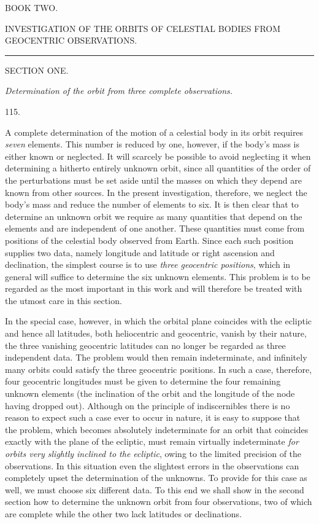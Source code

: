 \clearpage
{}
\begin{center}
{\Large BOOK TWO.}\par\bigskip
{\large INVESTIGATION OF THE ORBITS OF CELESTIAL BODIES FROM GEOCENTRIC OBSERVATIONS.}\par\bigskip
\rule{3em}{.3pt}\par\bigskip
{}
{\large SECTION ONE.}\par\medskip
\emph{Determination of the orbit from three complete observations.}\par\bigskip
\hypertarget{native-161-article115}{}115.
\end{center}
A complete determination of the motion of a celestial body in its orbit requires \emph{seven} elements. This number is reduced by one, however, if the body's mass is either known or neglected. It will scarcely be possible to avoid neglecting it when determining a hitherto entirely unknown orbit, since all quantities of the order of the perturbations must be set aside until the masses on which they depend are known from other sources. In the present investigation, therefore, we neglect the body's mass and reduce the number of elements to six. It is then clear that to determine an unknown orbit we require as many quantities that depend on the elements and are independent of one another. These quantities must come from positions of the celestial body observed from Earth. Since each such position supplies two data, namely longitude and latitude or right ascension and declination, the simplest course is to use \emph{three geocentric positions}, which in general will suffice to determine the six unknown elements. This problem is to be regarded as the most important in this work and will therefore be treated with the utmost care in this section.

In the special case, however, in which the orbital plane coincides with the ecliptic and hence all latitudes, both heliocentric and geocentric, vanish by their nature, the three vanishing geocentric latitudes can no longer be regarded as three independent data. The problem would then remain indeterminate, and infinitely many orbits could satisfy the three geocentric positions. In such a case, therefore, four geocentric longitudes must be given to determine the four remaining unknown elements (the inclination of the orbit and the longitude of the node having dropped out). Although on the principle of indiscernibles there is no reason to expect such a case ever to occur in nature, it is easy to suppose that the problem, which becomes absolutely indeterminate for an orbit that coincides exactly with the plane of the ecliptic, must remain virtually indeterminate \emph{for orbits very slightly inclined to the ecliptic}, owing to the limited precision of the observations. In this situation even the slightest errors in the observations can completely upset the determination of the unknowns. To provide for this case as well, we must choose six different data. To this end we shall show in the second section how to determine the unknown orbit from four observations, two of which are complete while the other two lack latitudes or declinations.

